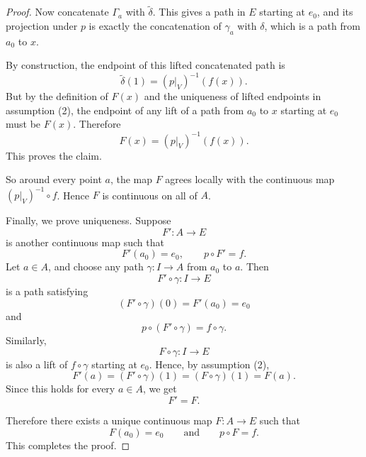 \documentclass{article}
\begin{document}
\begin{proof}
Now concatenate \(\Gamma_a\) with \(\widetilde\delta\). This gives a path in \(E\) starting at \(e_0\), and its projection under \(p\) is exactly the concatenation of \(\gamma_a\) with \(\delta\), which is a path from \(a_0\) to \(x\).

By construction, the endpoint of this lifted concatenated path is
\[
\widetilde\delta(1)=(p|_V)^{-1}(f(x)).
\]
But by the definition of \(F(x)\) and the uniqueness of lifted endpoints in assumption (2), the endpoint of any lift of a path from \(a_0\) to \(x\) starting at \(e_0\) must be \(F(x)\). Therefore
\[
F(x)=(p|_V)^{-1}(f(x)).
\]
This proves the claim.

So around every point \(a\), the map \(F\) agrees locally with the continuous map \((p|_V)^{-1}\circ f\). Hence \(F\) is continuous on all of \(A\).

Finally, we prove uniqueness. Suppose
\[
F':A\to E
\]
is another continuous map such that
\[
F'(a_0)=e_0,\qquad p\circ F'=f.
\]
Let \(a\in A\), and choose any path \(\gamma:I\to A\) from \(a_0\) to \(a\). Then
\[
F'\circ \gamma:I\to E
\]
is a path satisfying
\[
(F'\circ \gamma)(0)=F'(a_0)=e_0
\]
and
\[
p\circ(F'\circ \gamma)=f\circ\gamma.
\]
Similarly,
\[
F\circ \gamma:I\to E
\]
is also a lift of \(f\circ \gamma\) starting at \(e_0\). Hence, by assumption (2),
\[
F'(a)=(F'\circ\gamma)(1)=(F\circ\gamma)(1)=F(a).
\]
Since this holds for every \(a\in A\), we get
\[
F'=F.
\]

Therefore there exists a unique continuous map \(F:A\to E\) such that
\[
F(a_0)=e_0
\qquad\text{and}\qquad
p\circ F=f.
\]
This completes the proof.
\end{proof}
\end{document}
